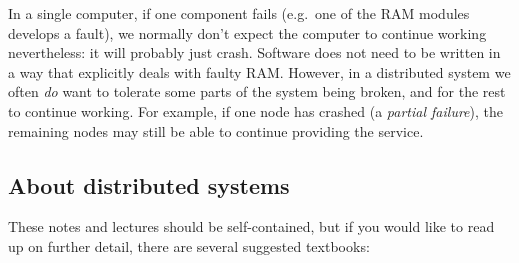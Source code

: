 In a single computer, if one component fails (e.g.\ one of the RAM modules develops a fault), we normally don't expect the computer to continue working nevertheless: it will probably just crash.
Software does not need to be written in a way that explicitly deals with faulty RAM.
However, in a distributed system we often \emph{do} want to tolerate some parts of the system being broken, and for the rest to continue working.
For example, if one node has crashed (a \emph{partial failure}), the remaining nodes may still be able to continue providing the service.

\subsection{About distributed systems}\label{sec:about}

These notes and lectures should be self-contained, but if you would like to read up on further detail, there are several suggested textbooks:
